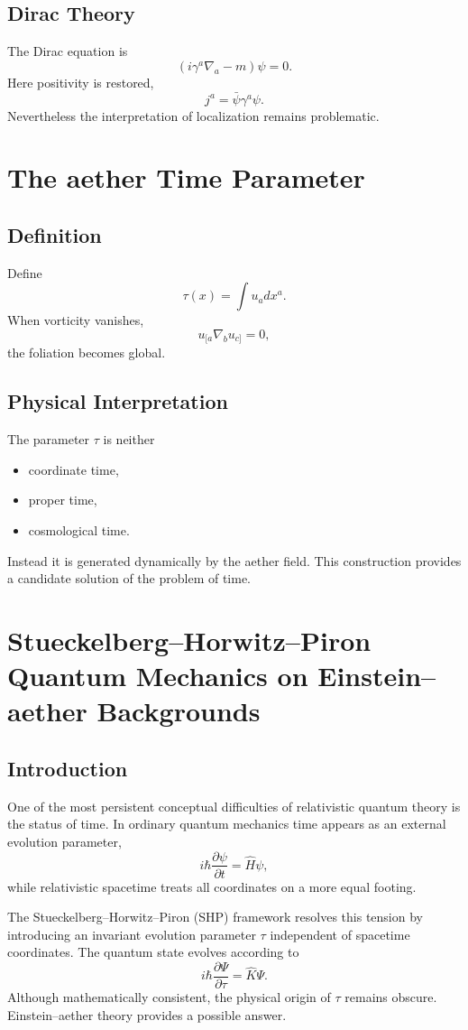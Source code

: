 \documentclass[11pt]{book}
\begin{document}
\section{Dirac Theory}
The Dirac equation is
\[(i\gamma^a\nabla_a-m)\psi=0.\]
Here positivity is restored,
\[j^a=\bar\psi\gamma^a\psi .\]
Nevertheless the interpretation of localization remains
problematic.

\chapter{The aether Time Parameter}
\section{Definition}
Define
\[\tau(x)=\int u_a dx^a .\]
When vorticity vanishes,
\[u_{[a}\nabla_b u_{c]}=0,\]
the foliation becomes global.

\section{Physical Interpretation}
The parameter $\tau$ is neither
\begin{itemize}
\item coordinate time,
\item proper time,
\item cosmological time.
\end{itemize}
Instead it is generated dynamically by the aether field.
This construction provides a candidate solution of the
problem of time.

\chapter{Stueckelberg--Horwitz--Piron Quantum Mechanics on Einstein--aether Backgrounds}
\section{Introduction}
One of the most persistent conceptual difficulties of relativistic
quantum theory is the status of time.
In ordinary quantum mechanics time appears as an external evolution
parameter,
\[i\hbar\frac{\partial\psi}{\partial t}=\hat H\psi ,\]
while relativistic spacetime treats all coordinates on a more equal
footing.

The Stueckelberg--Horwitz--Piron (SHP) framework resolves this tension
by introducing an invariant evolution parameter $\tau$ independent of
spacetime coordinates.  The quantum state evolves according to
\[i\hbar\frac{\partial \Psi}{\partial\tau}=\hat K\Psi .\]
Although mathematically consistent, the physical origin of $\tau$
remains obscure.
Einstein--aether theory provides a possible answer.
\end{document}
